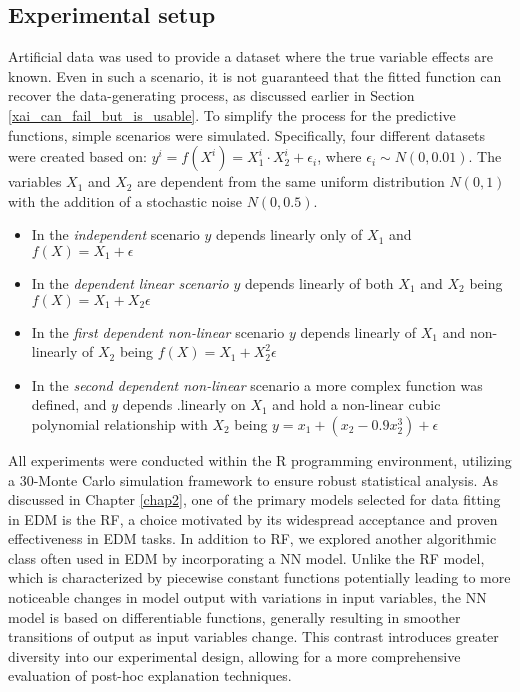 \subsection{Experimental setup}

Artificial data was used to provide a dataset where the true variable effects are known. Even in such a scenario, it is not guaranteed that the fitted function can recover the data-generating process, as discussed earlier in Section  \ref{xai_can_fail_but_is_usable}. To simplify the process for the predictive functions, simple scenarios were simulated. Specifically, four different datasets were created based on: $y^{i} = f(X^{i}) = X_{1}^{i} \cdot X_{2}^{i} + \epsilon_i$, where $\epsilon_i \sim N(0, 0.01)$. The variables $X_{1}$ and $X_{2}$ are dependent from the same uniform distribution $N(0,1)$ with the addition of a stochastic noise $N(0, 0.5)$. 

\begin{itemize}
    \item In the \textit{independent} scenario $y$ depends linearly only of $X_{1}$ and $f(X) = X_{1} + \epsilon$
    \item In the \textit{dependent linear scenario} $y$ depends linearly of both $X_{1}$ and $X_{2}$ being $f(X) = X_{1} + X_{2} \epsilon$
    \item In the \textit{first dependent non-linear} scenario $y$ depends linearly of $X_{1}$ and non-linearly of $X_{2}$ being  $f(X) = X_{1} + X_{2}^2 \epsilon$
    \item In the \textit{second dependent non-linear} scenario a more complex function was defined, and $y$ depends
    .linearly on $X_{1}$ and hold a non-linear cubic polynomial relationship with $X_{2}$ being  $y = x_1 + (x_2 - 0.9 x_2^3) + \epsilon$
\end{itemize}

All experiments were conducted within the R programming environment, utilizing a 30-Monte Carlo simulation framework to ensure robust statistical analysis. As discussed in Chapter \ref{chap2}, one of the primary models selected for data fitting in \gls{EDM} is the \gls{RF}, a choice motivated by its widespread acceptance and proven effectiveness in \gls{EDM} tasks. In addition to RF, we explored another algorithmic class often used in \gls{EDM} by incorporating a \gls{NN} model. Unlike the \gls{RF} model, which is characterized by piecewise constant functions potentially leading to more noticeable changes in model output with variations in input variables, the \gls{NN} model is based on differentiable functions, generally resulting in smoother transitions of output as input variables change. This contrast introduces greater diversity into our experimental design, allowing for a more comprehensive evaluation of post-hoc explanation techniques. 

